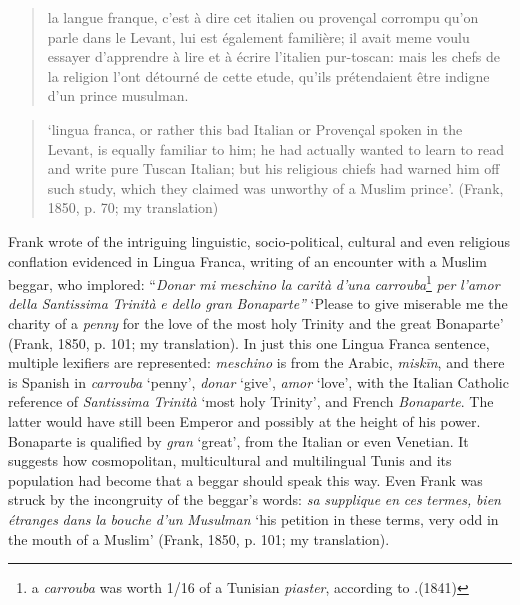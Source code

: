 \documentclass[output=paper]{langsci/langscibook}
\begin{document}
\begin{quote}
	la langue franque, c’est à dire cet italien ou provençal corrompu qu’on parle dans le Levant, lui est également familière; il avait meme voulu essayer d’apprendre à lire et à écrire l’italien pur-toscan: mais les chefs de la religion l’ont détourné de cette etude, qu’ils prétendaient être indigne d’un prince musulman.
\end{quote}

\begin{quote}
	‘lingua franca, or rather this bad Italian or Provençal spoken in the Levant, is equally familiar to him; he had actually wanted to learn to read and write  pure Tuscan Italian; but his religious chiefs had warned him off such study, which they claimed was unworthy of a Muslim prince’. (Frank, 1850, p. 70; my translation)
\end{quote}

Frank wrote of the intriguing linguistic, socio-political, cultural and even religious conflation evidenced in Lingua Franca, writing of an encounter with a Muslim beggar, who implored: “\textit{Donar} \textit{mi} \textit{meschino} \textit{la} \textit{carità} \textit{d’una} \textit{carrouba}\footnote{\citealt{Until1891} a \textit{carrouba} was worth 1/16 of a Tunisian \textit{piaster}, according to \citet{Rossetti1999}.(1841)} \textit{per} \textit{l’amor} \textit{della} \textit{Santissima} \textit{Trinità} \textit{e} \textit{dello} \textit{gran} \textit{Bonaparte”} ‘Please to give miserable me the charity of a \textit{penny} for the love of the most holy Trinity and the great Bonaparte’ (Frank, 1850, p. 101; my translation). In just this one Lingua Franca sentence, multiple lexifiers are represented: \textit{meschino} is from the Arabic, \textit{miskīn}, and there is Spanish in \textit{carrouba} ‘penny’, \textit{donar} ‘give’, \textit{amor} ‘love’, with the Italian Catholic reference of \textit{Santissima} \textit{Trinità} ‘most holy Trinity’, and French \textit{Bonaparte}. The latter would have still been Emperor and possibly at the height of his power. Bonaparte is qualified by \textit{gran} ‘great’, from the Italian or even Venetian. It suggests how cosmopolitan, multicultural and multilingual Tunis and its population had become that a beggar should speak this way. Even Frank was struck by the incongruity of the beggar’s words: \textit{sa} \textit{supplique} \textit{en} \textit{ces} \textit{termes,} \textit{bien} \textit{étranges} \textit{dans} \textit{la} \textit{bouche} \textit{d’un} \textit{Musulman} ‘his petition in these terms, very odd in the mouth of a Muslim’ (Frank, 1850, p. 101; my translation).
\end{document}
